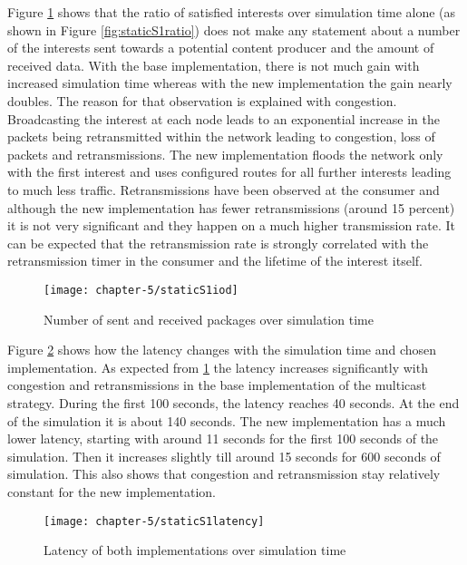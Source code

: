 Figure \ref{fig:staticS1iod} shows that the ratio of satisfied interests over simulation time alone (as shown in Figure \ref{fig:staticS1ratio}) does not make any statement about a number of the interests sent towards a potential content producer and the amount of received data. With the base implementation, there is not much gain with increased simulation time whereas with the new implementation the gain nearly doubles. The reason for that observation is explained with congestion. Broadcasting the interest at each node leads to an exponential increase in the packets being retransmitted within the network leading to congestion, loss of packets and retransmissions. The new implementation floods the network only with the first interest and uses configured routes for all further interests leading to much less traffic. Retransmissions have been observed at the consumer and although the new implementation has fewer retransmissions (around 15 percent) it is not very significant and they happen on a much higher transmission rate. It can be expected that the retransmission rate is strongly correlated with the retransmission timer in the consumer and the lifetime of the interest itself.

\begin{figure}[H]
  \centering
  \texttt{[image: chapter-5/staticS1iod]}
  \caption{Number of sent and received packages over simulation time}
  \label{fig:staticS1iod}
\end{figure}

Figure \ref{fig:staticS1latency} shows how the latency changes with the simulation time and chosen implementation. As expected from \ref{fig:staticS1iod} the latency increases significantly with congestion and retransmissions in the base implementation of the multicast strategy. During the first 100 seconds, the latency reaches 40 seconds. At the end of the simulation it is about 140 seconds. The new implementation has a much lower latency, starting with around 11 seconds for the first 100 seconds of the simulation. Then it increases slightly till around 15 seconds for 600 seconds of simulation. This also shows that congestion and retransmission stay relatively constant for the new implementation.

\clearpage

\begin{figure}[H]
  \centering
  \texttt{[image: chapter-5/staticS1latency]}
  \caption{Latency of both implementations over simulation time}
  \label{fig:staticS1latency}
\end{figure}

